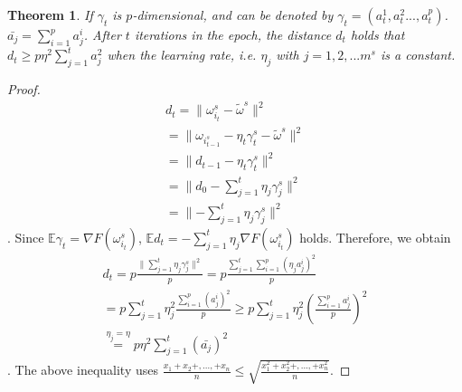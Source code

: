 \documentclass[letterpaper]{article}
\begin{document}
%

\newtheorem{Theorem}{\bf{Theorem}}
\newtheorem{Lemma}{\bf{Lemma}}


\begin{Theorem}
\label{theorem_vr_lower_bound}
If $\gamma_t$ is $p$-dimensional, and can be denoted by  $\gamma_t = (a_t^1, a_t^2..., a_t^p)$. $\bar{a_j} = \sum\limits_{i=1}^p a_j^i$.  After $t$ iterations in the epoch, the distance $d_t$ holds that $d_t \ge p \eta^2\sum\limits_{j=1}^t a_j^2$ when the learning rate, i.e. $\eta_j$ with $j=1,2, ...m^s$ is a constant.
\end{Theorem}
\begin{proof}
\begin{equation}
\begin{array}{ll}
d_{t} = \parallel \omega_{i_t}^s-\tilde{\omega}^s \parallel^2 \\
=\parallel \omega_{i_{t-1}^s}-\eta_t \gamma_t^s -\tilde{\omega}^s \parallel^2\\
=\parallel d_{t-1}-\eta_t \gamma_t^s \parallel^2\\
= \parallel d_0 - \sum\limits_{j=1}^t \eta_j \gamma_j^s \parallel^2 \\
=\parallel -\sum\limits_{j=1}^t \eta_j \gamma_j^s \parallel^2
\end{array}
\end{equation}. Since  $\mathbb{E}\gamma_t = \nabla F(\omega_{i_t}^s)$, $\mathbb{E}d_t = - \sum\limits_{j=1}^t \eta_j \nabla F(\omega_{i_t}^s)$ holds. Therefore, we obtain
\begin{equation}
\begin{array}{ll}
d_{t} =  p \frac{\parallel  \sum\limits_{j=1}^t \eta_j \gamma_j^s  \parallel^2}{p} = p \frac{\sum\limits_{j=1}^t\sum\limits_{i=1}^p (\eta_j a_j^i)^2}{p} \\
= p \sum\limits_{j=1}^t \eta_j^2 \frac{\sum\limits_{i=1}^p (a_j^i)^2}{p} \ge p \sum\limits_{j=1}^t \eta_j^2 \left(   \frac{\sum\limits_{i=1}^p a_j^i}{p}  \right)^2 \\
\overset{\eta_j\mathrm{ =} \eta}{=}p \eta^2 \sum\limits_{j=1}^t (\bar{a_j})^2 
\end{array}
\end{equation}. The above inequality uses $\frac{x_1+x_2+, ..., +x_n}{n} \le \sqrt{\frac{x_1^2+x_2^2+, ..., +x_n^2}{n}}$. 
\end{proof}
\end{document}
